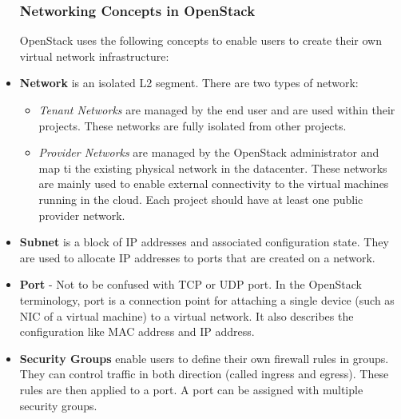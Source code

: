 \begin{itemize}
\subsubsection*{Networking Concepts in OpenStack}
OpenStack uses the following concepts to enable users to create their own virtual network infrastructure:
  \item{\textbf{Network} is an isolated L2 segment. There are two types of network:
    \begin{itemize}

      \item{\textit{Tenant Networks} are managed by the end user and are used within their projects. These networks are fully isolated from other projects.}
      \item{\textit{Provider Networks} are managed by the OpenStack administrator and map ti the existing physical network in the datacenter. These networks are mainly used to enable external connectivity to the virtual machines running in the cloud. Each project should have at least one public provider network.}
    \end{itemize}
    }
  \item{\textbf{Subnet} is a block of IP addresses and associated configuration state. They are used to allocate IP addresses to ports that are created on a network.}
  \item{\textbf{Port} - Not to be confused with TCP or UDP port. In the OpenStack terminology, port is a connection point for attaching a single device (such as NIC of a virtual machine) to a virtual network. It also describes the configuration like MAC address and IP address.}
  \item{\textbf{Security Groups} enable users to define their own firewall rules in groups. They can control traffic in both direction (called ingress and egress). These rules are then applied to a port. A port can be assigned with multiple security groups.}
  \\\cite{NetworkingGuide}
\end{itemize}


